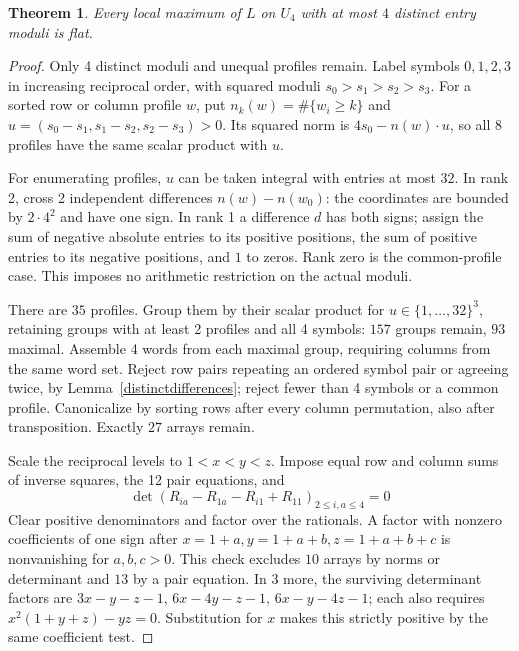 \documentclass[11pt,a4paper]{article}
\newtheorem{thm}{Theorem}[section]
\begin{document}
\begin{thm}\label{fourmoduli}
Every local maximum of $L$ on $U_4$ with at most $4$ distinct entry
moduli is flat.
\end{thm}
\begin{proof}
Only 4 distinct moduli and unequal profiles remain. Label symbols
$0,1,2,3$ in increasing reciprocal order, with squared moduli
$s_0>s_1>s_2>s_3$. For a sorted row or column profile $w$, put
$n_k(w)=\#\{w_i\ge k\}$ and $u=(s_0-s_1,s_1-s_2,s_2-s_3)>0$.
Its squared norm is $4s_0-n(w)\cdot u$, so all 8 profiles have the
same scalar product with $u$.

For enumerating profiles, $u$ can be taken integral with entries at
most $32$. In rank 2, cross 2 independent differences
$n(w)-n(w_0)$: the coordinates are bounded by $2\cdot4^2$ and have
one sign. In rank 1 a difference $d$ has both signs; assign the sum
of negative absolute entries to its positive positions, the sum of
positive entries to its negative positions, and $1$ to zeros.
Rank zero is the common-profile case. This imposes no arithmetic
restriction on the actual moduli.

There are $35$ profiles. Group them by their scalar product for
$u\in\{1,\ldots,32\}^3$, retaining groups with at least 2 profiles
and all 4 symbols: $157$ groups remain, $93$ maximal. Assemble
4 words from each maximal group, requiring columns from the same
word set. Reject row pairs repeating an ordered symbol pair or agreeing
twice, by Lemma~\ref{distinctdifferences}; reject fewer than 4
symbols or a common profile. Canonicalize by sorting rows after every
column permutation, also after transposition. Exactly $27$ arrays remain.

Scale the reciprocal levels to $1<x<y<z$. Impose equal row and column
sums of inverse squares, the 12 pair equations, and
\[
 \det(R_{ia}-R_{1a}-R_{i1}+R_{11})_{2\le i,a\le4}=0
\]
Clear positive denominators and factor over the rationals. A factor
with nonzero coefficients of one sign after
$x=1+a,y=1+a+b,z=1+a+b+c$ is nonvanishing for $a,b,c>0$.
This check excludes $10$ arrays by norms or determinant and $13$ by a
pair equation. In 3 more, the surviving determinant factors are
$3x-y-z-1$, $6x-4y-z-1$, $6x-y-4z-1$; each also requires
$x^2(1+y+z)-yz=0$. Substitution for $x$ makes this strictly positive
by the same coefficient test.


\end{proof}
\end{document}
